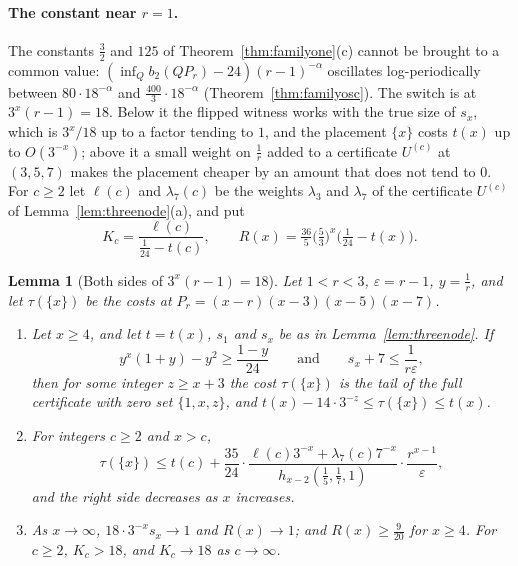 \documentclass[11pt]{article}
\newtheorem{lemma}[theorem]{Lemma}
\begin{document}
\paragraph{The constant near $r=1$.}  The constants $\tfrac32$ and $125$ of
Theorem~\ref{thm:familyone}(c) cannot be brought to a common value:
$(\inf_Qb_2(QP_r)-24)(r-1)^{-\alpha}$ oscillates log-periodically between
$80\cdot18^{-\alpha}$ and $\tfrac{400}3\cdot18^{-\alpha}$
(Theorem~\ref{thm:familyosc}).  The switch is at $3^x(r-1)=18$.  Below it
the flipped witness works with the true size of $s_x$, which is $3^x/18$ up
to a factor tending to $1$, and the placement $\{x\}$ costs $t(x)$ up to
$O(3^{-x})$; above it a small weight on $\tfrac1r$ added to a certificate
$U^{(c)}$ at $(3,5,7)$ makes the placement cheaper by an amount that does
not tend to $0$.  For $c\ge2$ let $\ell(c)$ and $\lambda_7(c)$ be the weights
$\lambda_3$ and $\lambda_7$ of the certificate $U^{(c)}$ of
Lemma~\ref{lem:threenode}(a), and put
\[
  K_c=\frac{\ell(c)}{\tfrac1{24}-t(c)},\qquad
  R(x)=\tfrac{36}5\bigl(\tfrac53\bigr)^x\bigl(\tfrac1{24}-t(x)\bigr).
\]

\begin{lemma}[Both sides of $3^x(r-1)=18$]\label{lem:eighteen}
Let $1<r<3$, $\varepsilon=r-1$, $y=\tfrac1r$, and let $\tau(\{x\})$ be the
costs at $P_r=(x-r)(x-3)(x-5)(x-7)$.
\begin{enumerate}
\item[(a)] Let $x\ge4$, and let $t=t(x)$, $s_1$ and $s_x$ be as in
Lemma~\ref{lem:threenode}.  If
\[
  y^x(1+y)-y^2\ge\frac{1-y}{24}\qquad\text{and}\qquad
  s_x+7\le\frac1{r\varepsilon},
\]
then for some integer $z\ge x+3$ the cost $\tau(\{x\})$ is the tail of the
full certificate with zero set $\{1,x,z\}$, and
$t(x)-14\cdot3^{-z}\le\tau(\{x\})\le t(x)$.
\item[(b)] For integers $c\ge2$ and $x>c$,
\[
  \tau(\{x\})\le t(c)+\frac{35}{24}\cdot
  \frac{\ell(c)3^{-x}+\lambda_7(c)7^{-x}}{h_{x-2}(\tfrac15,\tfrac17,1)}\cdot
  \frac{r^{x-1}}{\varepsilon},
\]
and the right side decreases as $x$ increases.
\item[(c)] As $x\to\infty$, $18\cdot3^{-x}s_x\to1$ and $R(x)\to1$; and
$R(x)\ge\tfrac9{20}$ for $x\ge4$.  For $c\ge2$, $K_c>18$, and $K_c\to18$ as
$c\to\infty$.
\end{enumerate}
\end{lemma}
\end{document}
